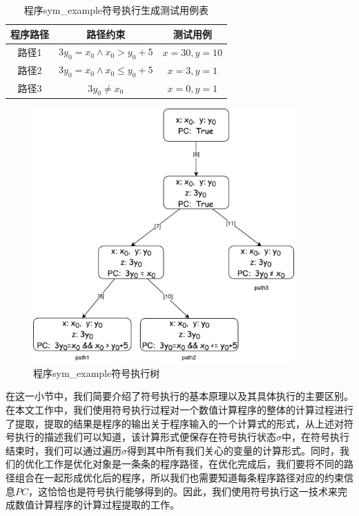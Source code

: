 \begin{table}
    \centering
    \begin{tabular}{ccc}
      \toprule
      \textbf{程序路径} & \textbf{路径约束} & \textbf{测试用例} \\
      \midrule
      路径1 & $3y_0 = x_0 \wedge x_0 > y_0 + 5$ & $x = 30, y = 10 $ \\
      路径2 & $3y_0 = x_0 \wedge x_0 \leq y_0 + 5 $ & $x = 3, y = 1$ \\
      路径3 & $3y_0 \neq x_0$ & $x = 0, y = 1$ \\
      \bottomrule
    \end{tabular}
    \caption{程序sym\_example符号执行生成测试用例表}\label{tbl:symexamres}
\end{table}

\begin{figure}[h]
    \centering
    \includegraphics[width=100mm]{fig/SymExecTree.pdf}
    \caption{程序sym\_example符号执行树} \label{fig:symexectree}
 \end{figure}


在这一小节中，我们简要介绍了符号执行的基本原理以及其具体执行的主要区别。在本文工作中，我们使用符号执行过程对一个数值计算程序的整体的计算过程进行了提取，提取的结果是程序的输出关于程序输入的一个计算式的形式，从上述对符号执行的描述我们可以知道，该计算形式便保存在符号执行状态$\sigma$中，在符号执行结束时，我们可以通过遍历$\sigma$得到其中所有我们关心的变量的计算形式。同时，我们的优化工作是优化对象是一条条的程序路径，在优化完成后，我们要将不同的路径组合在一起形成优化后的程序，所以我们也需要知道每条程序路径对应的约束信息$PC$，这恰恰也是符号执行能够得到的。因此，我们使用符号执行这一技术来完成数值计算程序的计算过程提取的工作。

